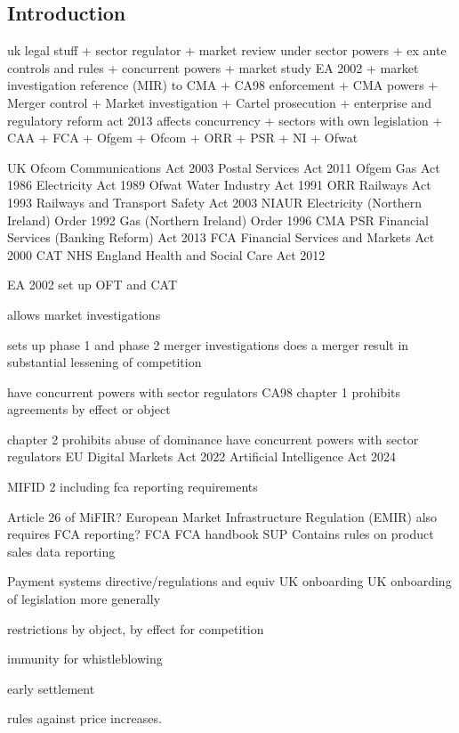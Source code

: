 
\subsection{Introduction}

uk legal stuff
+ sector regulator
  + market review under sector powers
  + ex ante controls and rules
+ concurrent powers
  + market study EA 2002
  + market investigation reference (MIR) to CMA
  + CA98 enforcement
+ CMA powers
  + Merger control
  + Market investigation
  + Cartel prosecution
+ enterprise and regulatory reform act 2013 affects concurrency
+ sectors with own legislation
  + CAA
  + FCA
  + Ofgem
  + Ofcom
  + ORR
  + PSR
  + NI
  + Ofwat


UK
	Ofcom	Communications Act 2003		Postal Services Act 2011
	Ofgem	Gas Act 1986		Electricity Act 1989
	Ofwat	Water Industry Act 1991
	ORR	Railways Act 1993		Railways and Transport Safety Act 2003
	NIAUR	Electricity (Northern Ireland) Order 1992		Gas (Northern Ireland) Order 1996
	CMA
	PSR	Financial Services (Banking Reform) Act 2013
	FCA	Financial Services and Markets Act 2000
	CAT
	NHS England	Health and Social Care Act 2012

	EA 2002
		set up OFT and CAT

		allows market investigations

		sets up phase 1 and phase 2 merger investigations
			does a merger result in substantial lessening of competition

		have concurrent powers with sector regulators
	CA98
		chapter 1
			prohibits agreements by effect or object

		chapter 2
			prohibits abuse of dominance
		have concurrent powers with sector regulators
	EU
		Digital Markets Act 2022
		Artificial Intelligence Act 2024

	MIFID 2
		including fca reporting requirements

	Article 26 of MiFIR?
	European Market Infrastructure Regulation (EMIR)
		also requires FCA reporting?
	FCA
		FCA handbook
			SUP
				Contains rules on product sales data reporting

Payment systems directive/regulations and equiv UK onboarding
UK onboarding of legislation more generally


restrictions by object, by effect for competition

immunity for whistleblowing

early settlement

rules against price increases.

